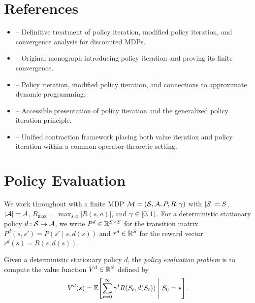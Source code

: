 \documentclass[11pt,a4paper]{article}
\begin{document}

\section{References}
\label{sec:references}

\begin{itemize}
    \item \citet[Chapter 6, Sections 6.4--6.5]{puterman2014} --
    Definitive treatment of policy iteration, modified policy
    iteration, and convergence analysis for discounted MDPs.
    \item \citet{howard1960} -- Original monograph introducing
    policy iteration and proving its finite convergence.
    \item \citet[Chapter 1, Sections 1.3--1.4]{bertsekas2012} --
    Policy iteration, modified policy iteration, and connections
    to approximate dynamic programming.
    \item \citet[Chapter 4]{suttonbarto2018} -- Accessible
    presentation of policy iteration and the generalized policy
    iteration principle.
    \item \citet{denardo1967} -- Unified contraction framework
    placing both value iteration and policy iteration within a
    common operator-theoretic setting.
\end{itemize}


\section{Policy Evaluation}
\label{sec:policy-evaluation}

We work throughout with a finite MDP
$\mathcal{M} = (\mathcal{S}, \mathcal{A}, P, R, \gamma)$ with
$|\mathcal{S}| = S$, $|\mathcal{A}| = A$,
$R_{\max} = \max_{s,a} |R(s,a)|$, and $\gamma \in [0,1)$.
For a deterministic stationary policy $d : \mathcal{S} \to \mathcal{A}$,
we write $P^d \in \mathbb{R}^{S \times S}$ for the transition matrix
$P^d(s,s') = P(s' \mid s, d(s))$ and $r^d \in \mathbb{R}^S$ for the reward
vector $r^d(s) = R(s, d(s))$.

\begin{definition}
\label{def:policy-eval}
Given a deterministic stationary policy $d$, the \emph{policy
evaluation problem} is to compute the value function
$V^d \in \mathbb{R}^S$ defined by
\[
    V^d(s) = \mathbb{E}\!\left[\sum_{t=0}^\infty \gamma^t R(S_t, d(S_t))
    \;\middle|\; S_0 = s\right].
\]
\end{definition}
\end{document}
